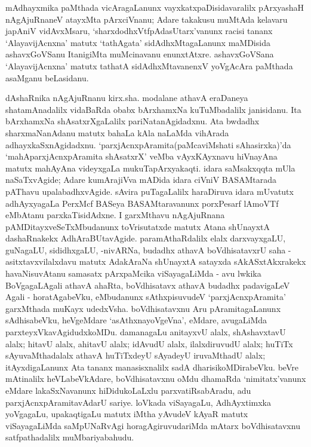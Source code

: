 mAdhayxmika paMthada vicAragaLanunx vayxkatxpaDisidavaralilx pArxyashaH nAgAjuRnaneV atayxMta pArxciVnanu; Adare takakusu muMtAda kelavaru japAniV vidAvxMsaru, `sharxdodhxVtfpAdasUtarx'vanunx racisi tananx `AlayavijAcnxna' matutx `tathAgata' sidAdhxMta\-gaLanunx maMDisida ashavxGoVSanu ItanigiMta muMcinavanu enunxtAtxre. ashavxGoVSana `AlayavijAcnxna' matutx tathatA sidAdhxMtavanenxV yoVgAcAra paMthada asaMganu beLasidanu.

dAshaRnika nAgAjuRnanu kirx.sha. modalane athavA eraDaneya shatamAnadalilx vidaBaRda obabx bArxhamxNa kuTuMbadalilx janisidanu. Ita bArxhamxNa shAsatxrXgaLalilx pariNatanAgidadxnu. Ata bwdadhx sharxmaNanAdanu matutx bahaLa kAla naLaMda vihArada adhayxkaSxnAgidadxnu. `parxjAcnxpAramita(paMcaviMshati sAhasirxka)'da `mahAparxjAcnxpAramita shAsatxrX' veMba vAyxKAyxnavu hiVnayAna matutx mahAyAna videyxgaLa mukuTapArxyakaqti. idara saMsakxqqta mUla naSaTxvAgide; Adare kumArajiVva mADida idara ciVniV BASAMtarada pAThavu upalabadhxvAgide. sAvira puTagaLalilx haraDiruva idara mUvatutx adhAyxyagaLa PerxMcf BASeya BASAMtaravanunx porxPesarf lAmoVTf eMbAtanu parxkaTisidAdxne. I garxMthavu nAgAjuRnana pAMDitayxveSeTxMbudanunx toVrisutatxde matutx Atana shUnayxtA dashaRnakekx AdhAraBUtavAgide. paramAthaRdalilx elalx darxvayxgaLU, guNagaLU, sididhxgaLU, -nivARNa, budadhx athavA boVdhisatavxrU saha - asitxtavxvilalxdavu matutx AdakAraNa shUnayxtA satayxda sAkASxtAkxrakekx havaNisuvAtanu samasatx pArxpaMcika viSayagaLiMda - avu lwkika BoVgagaLAgali athavA ahaRta, boVdhisatavx athavA budadhx padavigaLeV Agali - horatAgabeVku, eMbudanunx sAthxpisuvudeV `parxjAcnxpAramita' garxMthada muKayx udedxVsha. boVdhisatavxnu Aru pAramitagaLanunx sAdhisabeVku, heVgeMdare `asAthxnayoVgeVna', eMdare, avugaLiMda parxteyxVkavAgidudxkoMDu. damanagaLu anitayxvU alalx, shAshavxtavU alalx; hitavU alalx, ahitavU alalx; idAvudU alalx, ilalxdiruvudU alalx; huTiTx sAyuvaMthadalalx athavA huTiTxdeyU sAyadeyU iruvaMthadU alalx; itAyxdigaLanunx Ata tananx manasisxnalilx sadA dharisikoMDirabeVku. beVre mAtinalilx heVLabeVkAdare, boVdhisatavxnu oMdu dhamaRda `nimitatx'vanunx eMdare lakaSxNavanunx hiDidukoLaLxlu parxvatiRsabAradu, adu parxjAcnxpAramitavAdarU sariye. loVkada viSayagaLu, AdhAyxtimxka yoVgagaLu, upakaqtigaLu matutx iMtha yAvudeV kAyaR matutx viSayagaLiMda saMpUNaRvAgi horagAgiruvudariMda mAtarx boVdhisatavxnu satfpathadalilx muMbariyabahudu.

